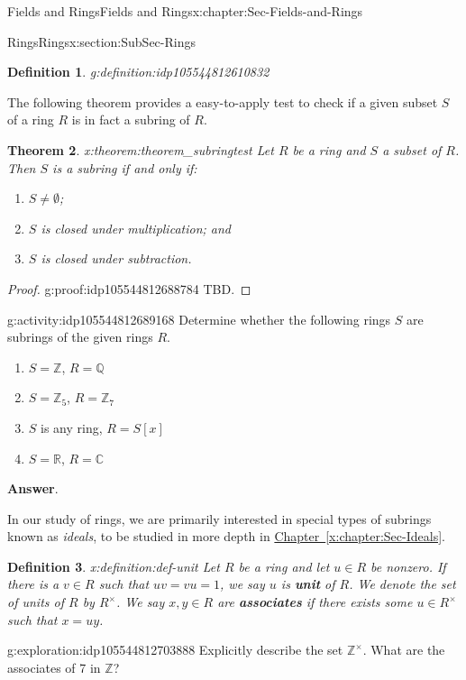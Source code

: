 \documentclass[oneside,10pt,]{book}
\newcommand{\blocktitlefont}{\relax}
\newcommand{\xreffont}{\relax}
\newcommand{\terminology}[1]{\textbf{#1}}
\numberwithin{equation}{section}
\def\C{{\mathbb C}}
\def\Z{{\mathbb Z}}
\def\Q{{\mathbb Q}}
\def\R{{\mathbb R}}
\newtheorem{theorem}{Theorem}[section]
\newtheorem{definition}[theorem]{Definition}
\begin{document}
\begin{chapterptx}{Fields and Rings}{}{Fields and Rings}{}{}{x:chapter:Sec-Fields-and-Rings}
\begin{sectionptx}{Rings}{}{Rings}{}{}{x:section:SubSec-Rings}
\begin{definition}{}{g:definition:idp105544812610832}
\end{definition}
The following theorem provides a easy-to-apply test to check if a given subset \(S\) of a ring \(R\) is in fact a subring of \(R\).%
\begin{theorem}{}{}{x:theorem:theorem_subringtest}%
%
Let \(R\) be a ring and \(S\) a subset of \(R\). Then \(S\) is a subring if and only if:%
\begin{enumerate}
\item{}\(S\ne \emptyset\);%
\item{}\(S\) is closed under multiplication; and%
\item{}\(S\) is closed under subtraction.%
\end{enumerate}
%
\end{theorem}
\begin{proof}{}{g:proof:idp105544812688784}
TBD.%
\end{proof}
\begin{activity}{}{g:activity:idp105544812689168}%
Determine whether the following rings \(S\) are subrings of the given rings \(R\).%
\begin{enumerate}
\item{}\(S = \Z\), \(R = \Q\)%
\item{}\(S = \Z_{5}\), \(R = \Z_{7}\)%
\item{}\(S\) is any ring, \(R = S[x]\)%
\item{}\(S = \R\), \(R = \C\)%
\end{enumerate}
%
\par\smallskip%
\noindent\textbf{\blocktitlefont Answer}.\hypertarget{g:answer:idp105544812696592}{}\quad{}\end{activity}%
In our study of rings, we are primarily interested in special types of subrings known as \emph{ideals}, to be studied in more depth in \hyperref[x:chapter:Sec-Ideals]{Chapter~{\xreffont\ref{x:chapter:Sec-Ideals}}}.%
\begin{definition}{}{x:definition:def-unit}%
%
%
Let \(R\) be a ring and let \(u\in R\) be nonzero. If there is a \(v\in R\) such that \(uv = vu = 1\), we say \(u\) is \terminology{unit} of \(R\). We denote the set of units of \(R\) by \(R^\times\). We say \(x,y\in R\) are \terminology{associates} if there exists some \(u\in R^\times\) such that \(x = uy\).%
\end{definition}
\begin{exploration}{}{g:exploration:idp105544812703888}%
Explicitly describe the set \(\Z^\times\). What are the associates of 7 in \(\Z\)?%

\end{exploration}
\end{sectionptx}
\end{chapterptx}
\end{document}
